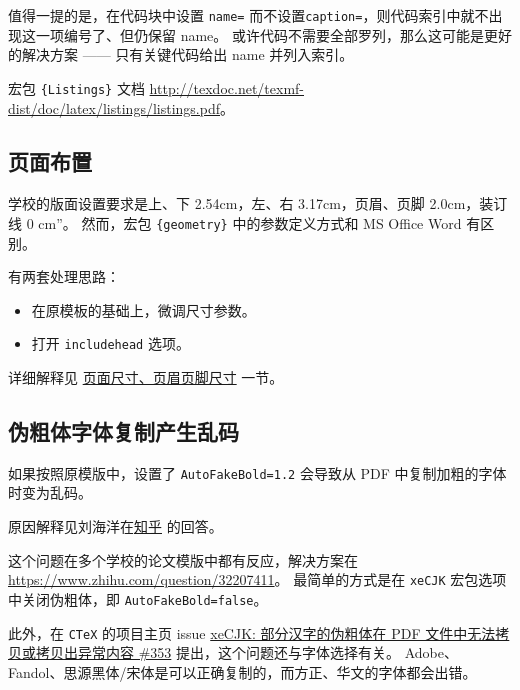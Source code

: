 \documentclass[../Main/thesis.tex]{subfiles}
\begin{document}
值得一提的是，在代码块中设置 \texttt{name=} 而不设置\texttt{caption=}，则代码索引中就不出现这一项编号了、但仍保留 name。
或许代码不需要全部罗列，那么这可能是更好的解决方案 —— 只有关键代码给出 name 并列入索引。

宏包 \texttt{\{Listings\}} 文档
\url{http://texdoc.net/texmf-dist/doc/latex/listings/listings.pdf}。

\subsection{页面布置}

学校的版面设置要求是上、下 2.54cm，左、右 3.17cm，页眉、页脚
2.0cm，装订线 0 cm''。 然而，宏包 \texttt{\{geometry\}}
中的参数定义方式和 MS Office Word 有区别。

有两套处理思路：

\begin{itemize}
\item
  在原模板的基础上，微调尺寸参数。

\item
  打开 \texttt{includehead} 选项。

\end{itemize}

详细解释见
\protect\hyperlink{geometry-ux5cux25e9ux5cux25a1ux5cux25b5ux5cux25e9ux5cux259dux5cux25a2ux5cux25e5ux5cux25b0ux5cux25baux5cux25e5ux5cux25afux5cux25b8ux5cux25e9ux5cux25a1ux5cux25b5ux5cux25e7ux5cux259cux5cux2589ux5cux25e9ux5cux25a1ux5cux25b5ux5cux25e8ux5cux2584ux5cux259aux5cux25e5ux5cux25b0ux5cux25baux5cux25e5ux5cux25afux5cux25b8}{页面尺寸、页眉页脚尺寸}
一节。

\subsection{伪粗体字体复制产生乱码}

如果按照原模版中，设置了 \texttt{AutoFakeBold=1.2} 会导致从 PDF
中复制加粗的字体时变为乱码。

原因解释见刘海洋在\href{https://www.zhihu.com/question/59597144}{知乎}
的回答。

这个问题在多个学校的论文模版中都有反应，解决方案在
\url{https://www.zhihu.com/question/32207411}。 最简单的方式是在
\texttt{xeCJK} 宏包选项中关闭伪粗体，即 \texttt{AutoFakeBold=false}。

此外，在 \texttt{CTeX} 的项目主页 issue
\href{https://github.com/CTeX-org/ctex-kit/issues/353}{xeCJK:
部分汉字的伪粗体在 PDF 文件中无法拷贝或拷贝出异常内容 \#353}
提出，这个问题还与字体选择有关。
Adobe、Fandol、思源黑体/宋体是可以正确复制的，而方正、华文的字体都会出错。
\end{document}
